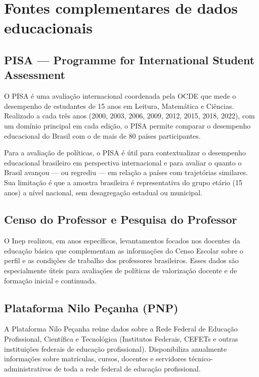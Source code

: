 \section{Fontes complementares de dados educacionais}

\subsection{PISA — Programme for International Student Assessment}

O PISA é uma avaliação internacional coordenada pela OCDE que mede o desempenho de estudantes de 15 anos em Leitura, Matemática e Ciências. Realizado a cada três anos (2000, 2003, 2006, 2009, 2012, 2015, 2018, 2022), com um domínio principal em cada edição, o PISA permite comparar o desempenho educacional do Brasil com o de mais de 80 países participantes.

Para a avaliação de políticas, o PISA é útil para contextualizar o desempenho educacional brasileiro em perspectiva internacional e para avaliar o quanto o Brasil avançou — ou regrediu — em relação a países com trajetórias similares. Sua limitação é que a amostra brasileira é representativa do grupo etário (15 anos) a nível nacional, sem desagregação estadual ou municipal.

\subsection{Censo do Professor e Pesquisa do Professor}

O Inep realizou, em anos específicos, levantamentos focados nos docentes da educação básica que complementam as informações do Censo Escolar sobre o perfil e as condições de trabalho dos professores brasileiros. Esses dados são especialmente úteis para avaliações de políticas de valorização docente e de formação inicial e continuada.

\subsection{Plataforma Nilo Peçanha (PNP)}

A Plataforma Nilo Peçanha reúne dados sobre a Rede Federal de Educação Profissional, Científica e Tecnológica (Institutos Federais, CEFETs e outras instituições federais de educação profissional). Disponibiliza anualmente informações sobre matrículas, cursos, docentes e servidores técnico-administrativos de toda a rede federal de educação profissional.

